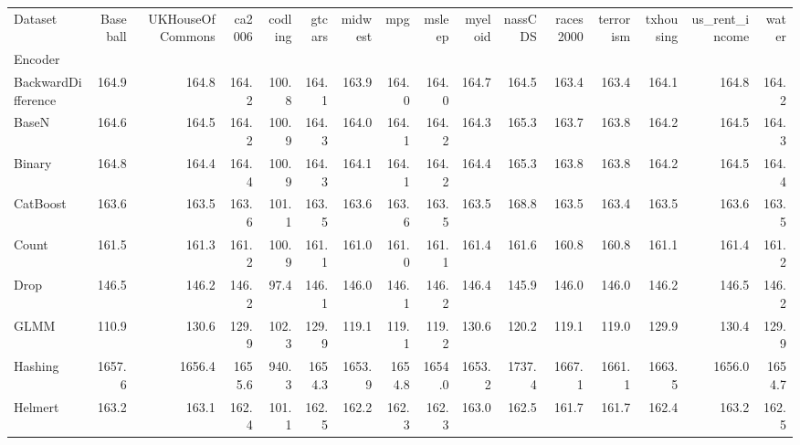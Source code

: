 \begin{tabular}{lrrrrrrrrrrrrrrr}
\toprule
Dataset &  Baseball &  UKHouseOfCommons &  ca2006 &  codling &  gtcars &  midwest &     mpg &  msleep &  myeloid &  nassCDS &  races2000 &  terrorism &  txhousing &  us\_rent\_income &   water \\
Encoder            &           &                   &         &          &         &          &         &         &          &          &            &            &            &                 &         \\
\midrule
BackwardDifference &     164.9 &             164.8 &   164.2 &    100.8 &   164.1 &    163.9 &   164.0 &   164.0 &    164.7 &    164.5 &      163.4 &      163.4 &      164.1 &           164.8 &   164.2 \\
BaseN              &     164.6 &             164.5 &   164.2 &    100.9 &   164.3 &    164.0 &   164.1 &   164.2 &    164.3 &    165.3 &      163.7 &      163.8 &      164.2 &           164.5 &   164.3 \\
Binary             &     164.8 &             164.4 &   164.4 &    100.9 &   164.3 &    164.1 &   164.1 &   164.2 &    164.4 &    165.3 &      163.8 &      163.8 &      164.2 &           164.5 &   164.4 \\
CatBoost           &     163.6 &             163.5 &   163.6 &    101.1 &   163.5 &    163.6 &   163.6 &   163.5 &    163.5 &    168.8 &      163.5 &      163.4 &      163.5 &           163.6 &   163.5 \\
Count              &     161.5 &             161.3 &   161.2 &    100.9 &   161.1 &    161.0 &   161.0 &   161.1 &    161.4 &    161.6 &      160.8 &      160.8 &      161.1 &           161.4 &   161.2 \\
Drop               &     146.5 &             146.2 &   146.2 &     97.4 &   146.1 &    146.0 &   146.1 &   146.2 &    146.4 &    145.9 &      146.0 &      146.0 &      146.2 &           146.5 &   146.2 \\
GLMM               &     110.9 &             130.6 &   129.9 &    102.3 &   129.9 &    119.1 &   119.1 &   119.2 &    130.6 &    120.2 &      119.1 &      119.0 &      129.9 &           130.4 &   129.9 \\
Hashing            &    1657.6 &            1656.4 &  1655.6 &    940.3 &  1654.3 &   1653.9 &  1654.8 &  1654.0 &   1653.2 &   1737.4 &     1667.1 &     1661.1 &     1663.5 &          1656.0 &  1654.7 \\
Helmert            &     163.2 &             163.1 &   162.4 &    101.1 &   162.5 &    162.2 &   162.3 &   162.3 &    163.0 &    162.5 &      161.7 &      161.7 &      162.4 &           163.2 &   162.5 \\

\end{tabular}
